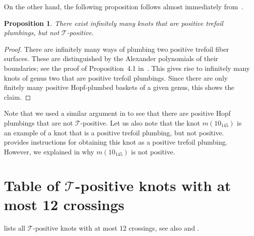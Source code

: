 \documentclass{amsart}
\theoremstyle{definition}
\theoremstyle{remark}
\theoremstyle{plain}
\newtheorem{proposition}[definition]{Proposition}
\newcommand{\T}{\mathcal{T}}
\begin{document}
On the other hand, the following proposition follows almost immediately from~\cite{kegel2024unknottingfiberedpositiveknots}.

\begin{proposition}
\label{prop:inf_tref_plumb_not_T-pos}
    There exist infinitely many knots that are positive trefoil plumbings, but not $\T$-positive.
\end{proposition}

\begin{proof}
    There are infinitely many ways of plumbing two positive trefoil fiber surfaces. These are distinguished by the Alexander polynomials of their boundaries; see the proof of Proposition~4.1 in~\cite{kegel2024unknottingfiberedpositiveknots}. This gives rise to infinitely many knots of genus two that are positive trefoil plumbings. Since there are only finitely many positive Hopf-plumbed baskets of a given genus, this shows the claim.
\end{proof}

Note that we used a similar argument in  to see that there are positive Hopf plumbings that are not $\T$-positive.
Let us also note that the knot $m(10_{145})$ is an example of a knot that is a positive trefoil plumbing, but not positive. \cite[Proof of Proposition~4.1]{kegel2024unknottingfiberedpositiveknots} provides instructions for obtaining this knot as a positive trefoil plumbing. However, we explained in  why $m(10_{145})$ is not positive.

\newpage 
\appendix

\section{Table of \texorpdfstring{$\T$-positive}{T-positive} knots with at most 12 crossings}\label{sec:table}

 lists all $\T$-positive knots with at most 12 crossings, see also 
 and . 
\end{document}
